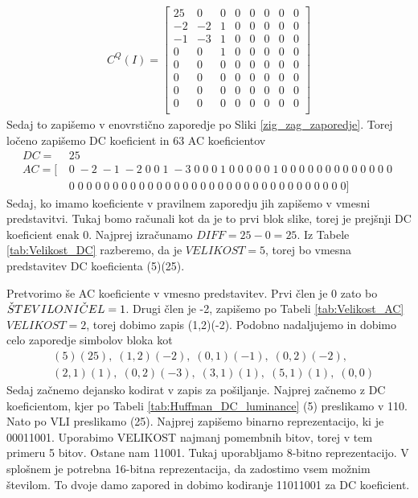 \documentclass[a4paper,12pt,openright]{book}
\begin{document}
\begin{gather*}
 C^Q(I) =
  \begin{bmatrix}
 25&  0&  0&  0&  0&  0&  0&  0\\
 -2& -2&  1&  0&  0&  0&  0&  0\\
 -1& -3&  1&  0&  0&  0&  0&  0\\
  0&  0&  1&  0&  0&  0&  0&  0\\
  0&  0&  0&  0&  0&  0&  0&  0\\
  0&  0&  0&  0&  0&  0&  0&  0\\
  0&  0&  0&  0&  0&  0&  0&  0\\
  0&  0&  0&  0&  0&  0&  0&  0\\
   \end{bmatrix}
\end{gather*}
Sedaj to zapišemo v enovrstično zaporedje po Sliki \ref{zig_zag_zaporedje}. Torej ločeno zapišemo DC koeficient in 63 AC koeficientov
\begin{equation*}
  \begin{aligned}
    DC =\;\,& 25 \\
    AC = [&0\;-2\;-1\;-2\;0\;0\;1\;-3\;0\;0\;0\;1\;0\;0\;0\;0\;
           0\;1\;0\;0\;0\;0\;0\;0\;0\;0\;0\;0\;0\;0\;0\;\\
          &0\;0\;0\;0\;0\;0\;0\;0\;0\;0\;0\;0\;0\;0\;0\;0\;
           0\;0\;0\;0\;0\;0\;0\;0\;0\;0\;0\;0\;0\;0\;0\;0]
  \end{aligned}
\end{equation*}
Sedaj, ko imamo koeficiente v pravilnem zaporedju jih zapišemo v vmesni predstavitvi. Tukaj bomo računali kot da je to prvi blok slike, torej je prejšnji DC koeficient enak 0. Najprej izračunamo \(DIFF = 25-0 = 25\). Iz Tabele \ref{tab:Velikost_DC} razberemo, da je \(VELIKOST = 5\), torej bo vmesna predstavitev DC koeficienta (5)(25). \par
Pretvorimo še AC koeficiente v vmesno predstavitev. Prvi člen je 0 zato bo \(\Check{S}TEVILONI\Check{C}EL=1\). Drugi člen je -2, zapišemo po Tabeli \ref{tab:Velikost_AC} \(VELIKOST = 2\), torej dobimo zapis (1,2)(-2). Podobno nadaljujemo in dobimo celo zaporedje simbolov bloka kot
\begin{equation*}
  \begin{aligned}
    &(5)(25),\;(1,2)(-2),\;(0,1)(-1),\;(0,2)(-2),\\
    &(2,1)(1),\;(0,2)(-3),\;(3,1)(1),\;(5,1)(1),\;(0,0)
  \end{aligned}
\end{equation*}
Sedaj začnemo dejansko kodirat v zapis za pošiljanje. Najprej začnemo z DC koeficientom, kjer po Tabeli \ref{tab:Huffman_DC_luminance} (5) preslikamo v 110. Nato po VLI preslikamo (25). Najprej zapišemo binarno reprezentacijo, ki je 00011001. Uporabimo VELIKOST najmanj pomembnih bitov, torej v tem primeru 5 bitov. Ostane nam 11001. Tukaj uporabljamo 8-bitno reprezentacijo. V splošnem je potrebna 16-bitna reprezentacija, da zadostimo vsem možnim številom. To dvoje damo zapored in dobimo kodiranje 11011001 za DC koeficient.\par
\end{document}
